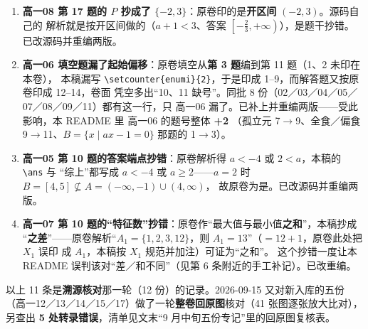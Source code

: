 \documentclass[a4paper,11pt]{article}
\begin{document}
\begin{enumerate}
  \((-\infty,-3]\)，本稿误抄成 \((-\infty,-3)\)------\textbf{本稿自己的解析写的就是 \((-\infty,-3]\)
  （\(a=-3\) 时 \(B=\{2\}\subseteq A\) 也成立），即解析对、\texttt{\textbackslash{}ans} 错}。已改源码并重编两版。
\item
  \textbf{高一08 第 17 题的 \(P\) 抄成了 \(\{-2,3\}\)}：原卷印的是\textbf{开区间} \((-2,3)\)。源码自己的
  解析就是按开区间做的（\(a+1<3\)、答案 \(\left[-\tfrac{2}{3},+\infty\right)\)），是题干抄错。
  已改源码并重编两版。
\item
  \textbf{高一06 填空题漏了起始偏移}：原卷填空从\textbf{第 3 题}编到第 11 题（1、2 未印在本卷），
  本稿漏写 \texttt{\textbackslash{}setcounter\{enumi\}\{2\}}，于是印成 1--9，而解答题又按原卷印成 12--14，卷面
  凭空多出``10、11 缺号''。同批 8 份（02／03／04／05／07／08／09／11）都有这一行，只
  高一06 漏了。已补上并重编两版------受此影响，本 README 里 高一06 的题号整体 \textbf{+2}
  （孤立元 7$\to$9、全食／偏食 9$\to$11、\(B=\{x\mid ax-1=0\}\) 那题的 1$\to$3）。
\item
  \textbf{高一05 第 10 题的答案端点抄错}：原卷解析得 \(a<-4\) 或 \(2<a\)，本稿的 \texttt{\textbackslash{}ans} 与
  ``综上''都写成 \(a<-4\) 或 \(a\geqslant 2\)------\(a=2\) 时 \(B=[4,5]\not\subseteq A=(-\infty,-1)\cup(4,\infty)\)，
  故原卷为是。已改源码并重编两版。
\item
  \textbf{高一07 第 10 题的``特征数''抄错}：原卷作``最大值与最小值\textbf{之和}''，本稿抄成
  ``\textbf{之差}''------原卷解析``\(A_1=\{1,2,3,12\}\)，则 \(A_1=13\)''（\(=12+1\)，原卷此处把 \(X_1\) 误印
  成 \(A_1\)，本稿按 \(X_1\) 规范并加注）可证为``之和''。
  这个抄错一度让本 README 误判该对``差／和不同''（见第 6 条附近的手工补记）。已改重编。
\end{enumerate}

以上 11 条是\textbf{溯源核对}那一轮（12 份）的记录。2026-09-15 又对新入库的五份
（高一12／13／14／15／17）做了一轮\textbf{整卷回原图}核对（41 张图逐张放大比对），
另查出 \textbf{5 处转录错误}，清单见文末``9 月中旬五份专记''里的回原图复核表。
\end{document}
